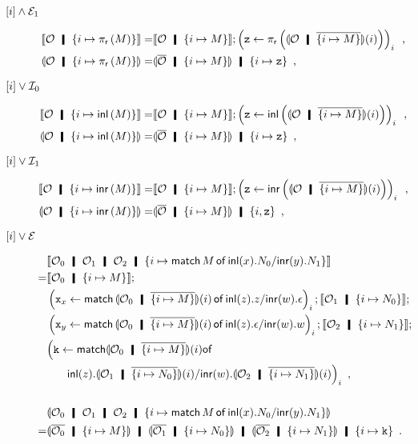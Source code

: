 \begin{description}
\begin{align*}
\end{align*}
 \item[$\lbrack {i}\rbrack\wedge\mathcal E_1$]
\begin{align*}
 \semo{\hypert\hmid \imapsto{\lpir M}} =& \semo{\hypert\hmid \imapsto{M}};
 \left(\p z \leftarrow
 \lpir{ \semoi{\hypert\hmid\overline{\imapsto{M}}}(i) }\right)_i\enspace, \\
 \semoi{\hypert\hmid \imapsto{\lpir{M}}}=& \semoi{\overline \hypert\hmid
 \imapsto{M}}\hmid
 \{{i\mapsto \p z}\}\enspace,
\end{align*}
 \item[$\lbrack {i}\rbrack\vee\mathcal I_0$]
\begin{align*}
 \semo{\hypert\hmid \imapsto{\linl{M}}} =
 & \semo{\hypert\hmid \imapsto{M}}; \left(\p z \leftarrow
 \linl{ \semoi{\hypert\hmid\overline{\imapsto{M}}}(i)}\right)_i\enspace, \\
 \semoi{\hypert\hmid \imapsto{\linl M}}=& \semoi{\overline \hypert\hmid
 \imapsto{M}}
 \hmid
 \{{i\mapsto \p z}\}\enspace,
\end{align*}
 \item[$\lbrack {i}\rbrack\vee\mathcal I_1$]
\begin{align*}
 \semo{\hypert\hmid \imapsto{\linr M}} =& \semo{\hypert\hmid \imapsto{M}};
 \left(\p z \leftarrow
 \linr{\semoi{\hypert\hmid\overline{\imapsto{M}}}(i)}\right)_i\enspace, \\
 \semoi{\hypert\hmid \imapsto{\linr{M}}}=& \semoi{\overline \hypert\hmid
 \imapsto{M}}\hmid
 \{{i, \p z}\}\enspace,
\end{align*}
 \item[$\lbrack {i}\rbrack\vee\mathcal E$]
\begin{align*}
 &\semo{\hypert_0\hmid \hypert_1\hmid \hypert_2\hmid \{i\mapsto
 \mat M x{N_0}y{N_1}\}}
 \\
 =&\semo{\hypert_0\hmid\imapsto{M}};\\&
 \left(\p x_x\leftarrow
 \mat{\semoi{\hypert_0\hmid\overline{\imapsto{M}}}(i)}{z}{z}{w}{\epsilon}\right)_i;
 \semo{\hypert_1\hmid\imapsto{N_0}};\\&
 \left(\p x_y\leftarrow
 \mat{\semoi{\hypert_0\hmid\overline{\imapsto{M}}}(i)}{z}{\epsilon}{w}{w}\right)_i;
 \semo{\hypert_2\hmid\imapsto{N_1}};\\&
 \Big(\p k \leftarrow
 \mathsf{match}
 {\semoi{\hypert_0\hmid\overline{\imapsto{M}}}(i)}
 \mathsf{of} \\
 &\phantom{k\leftarrow}\inl{z}. {\semoi{\hypert_1\hmid\overline{\imapsto{N_0}}}(i)}/\inr{w}. {\semoi{\hypert_2\hmid\overline{\imapsto{N_1}}}(i)}\Big)_i\enspace,
 \\
 \\
 &\semoi{\hypert_0\hmid \hypert_1\hmid \hypert_2\hmid \{i\mapsto
 \mat M x{N_0}y{N_1}\}}\\
 =&
 \semoi{\overline{\hypert_0}\hmid \imapsto{M}}\hmid
 \semoi{\overline{\hypert_1}\hmid \imapsto{N_0}}\hmid
 \semoi{\overline{\hypert_2}\hmid \imapsto{N_1}}\hmid \imapsto{\p k}\enspace.
\end{align*}
\end{description}
